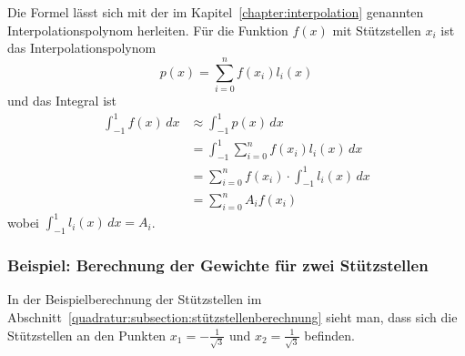 Die Formel lässt sich mit der im Kapitel~\ref{chapter:interpolation} genannten 
Interpolationspolynom herleiten.
Für die Funktion $f(x)$ mit Stützstellen $x_{i}$ ist das Interpolationspolynom
\begin{equation}
    p(x) = \sum_{i=0}^{n} f(x_{i})l_{i}(x)
\end{equation}
und das Integral ist 
\begin{align}
    \int_{-1}^{1}f(x)\,dx &\approx \int_{-1}^{1}p(x)\,dx \\
    &= \int_{-1}^{1} \sum_{i=0}^{n} f(x_{i}) l_{i}(x) \,dx \\
    &= \sum_{i=0}^{n} f(x_{i}) \cdot \int_{-1}^{1}  l_{i}(x) \,dx \\
    &= \sum_{i=0}^{n} A_{i} f(x_{i})
\end{align}
wobei $\int_{-1}^{1}  l_{i}(x) \,dx = A_{i}$.

\subsubsection{Beispiel: Berechnung der Gewichte für zwei Stützstellen}
In der Beispielberechnung der Stützstellen im
Abschnitt~\ref{quadratur:subsection:stützstellenberechnung} sieht man, dass sich die 
Stützstellen an den Punkten $x_{1} = -\frac{1}{\sqrt{3}} $ und $x_{2} = \frac{1}{\sqrt{3}} $ befinden.


